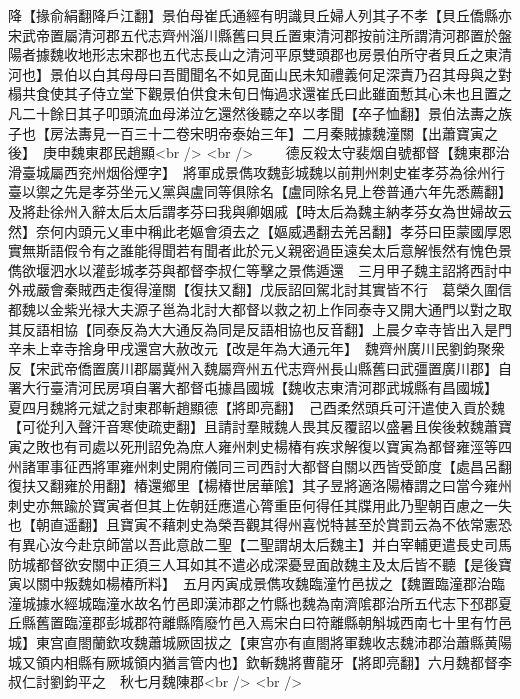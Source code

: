 降【掾俞絹翻降戶江翻】景伯母崔氏通經有明識貝丘婦人列其子不孝【貝丘僑縣亦宋武帝置屬清河郡五代志齊州淄川縣舊曰貝丘置東清河郡按前注所謂清河郡置於盤陽者據魏收地形志宋郡也五代志長山之清河平原雙頭郡也房景伯所守者貝丘之東清河也】景伯以白其母母曰吾聞聞名不如見面山民未知禮義何足深責乃召其母與之對榻共食使其子侍立堂下觀景伯供食未旬日悔過求還崔氏曰此雖面慙其心未也且置之凡二十餘日其子叩頭流血母涕泣乞還然後聽之卒以孝聞【卒子恤翻】景伯法夀之族子也【房法夀見一百三十二卷宋明帝泰始三年】二月秦賊據魏潼關【出蕭寶寅之後】　庚申魏東郡民趙顯<br />
<br />
　　德反殺太守裴烟自號都督【魏東郡治滑臺城屬西兖州烟俗煙字】　將軍成景儁攻魏彭城魏以前荆州刺史崔孝芬為徐州行臺以禦之先是孝芬坐元乂黨與盧同等俱除名【盧同除名見上卷普通六年先悉薦翻】及將赴徐州入辭太后太后謂孝芬曰我與卿姻戚【時太后為魏主納孝芬女為世婦故云然】奈何内頭元乂車中稱此老嫗會須去之【嫗威遇翻去羌呂翻】孝芬曰臣蒙國厚恩實無斯語假令有之誰能得聞若有聞者此於元乂親密過臣遠矣太后意解悵然有愧色景儁欲堰泗水以灌彭城孝芬與都督李叔仁等擊之景儁遁還　三月甲子魏主詔將西討中外戒嚴會秦賊西走復得潼關【復扶又翻】戊辰詔回駕北討其實皆不行　葛榮久圍信都魏以金紫光禄大夫源子邕為北討大都督以救之初上作同泰寺又開大通門以對之取其反語相協【同泰反為大大通反為同是反語相協也反音翻】上晨夕幸寺皆出入是門辛未上幸寺捨身甲戌還宫大赦改元【改是年為大通元年】　魏齊州廣川民劉鈞聚衆反【宋武帝僑置廣川郡屬冀州入魏屬齊州五代志齊州長山縣舊曰武彊置廣川郡】自署大行臺清河民房項自署大都督屯據昌國城【魏收志東清河郡武城縣有昌國城】　夏四月魏將元斌之討東郡斬趙顯德【將即亮翻】　己酉柔然頭兵可汗遣使入貢於魏【可從刋入聲汗音寒使疏吏翻】且請討羣賊魏人畏其反覆詔以盛暑且俟後敕魏蕭寶寅之敗也有司處以死刑詔免為庶人雍州刺史楊椿有疾求解復以寶寅為都督雍涇等四州諸軍事征西將軍雍州刺史開府儀同三司西討大都督自關以西皆受節度【處昌呂翻復扶又翻雍於用翻】椿還鄉里【楊椿世居華隂】其子昱將適洛陽椿謂之曰當今雍州刺史亦無踰於寶寅者但其上佐朝廷應遣心膂重臣何得任其牒用此乃聖朝百慮之一失也【朝直遥翻】且寶寅不藉刺史為榮吾觀其得州喜悦特甚至於賞罰云為不依常憲恐有異心汝今赴京師當以吾此意啟二聖【二聖謂胡太后魏主】并白宰輔更遣長史司馬防城都督欲安關中正須三人耳如其不遣必成深憂昱面啟魏主及太后皆不聽【是後寶寅以關中叛魏如楊椿所料】　五月丙寅成景儁攻魏臨潼竹邑拔之【魏置臨潼郡治臨潼城據水經城臨潼水故名竹邑即漢沛郡之竹縣也魏為南濟隂郡治所五代志下邳郡夏丘縣舊置臨潼郡彭城郡符離縣隋廢竹邑入焉宋白曰符離縣朝斛城西南七十里有竹邑城】東宫直閤蘭欽攻魏蕭城厥固拔之【東宫亦有直閤將軍魏收志魏沛郡治蕭縣黄陽城又領内相縣有厥城領内猶言管内也】欽斬魏將曹龍牙【將即亮翻】六月魏都督李叔仁討劉鈞平之　秋七月魏陳郡<br />
<br />
